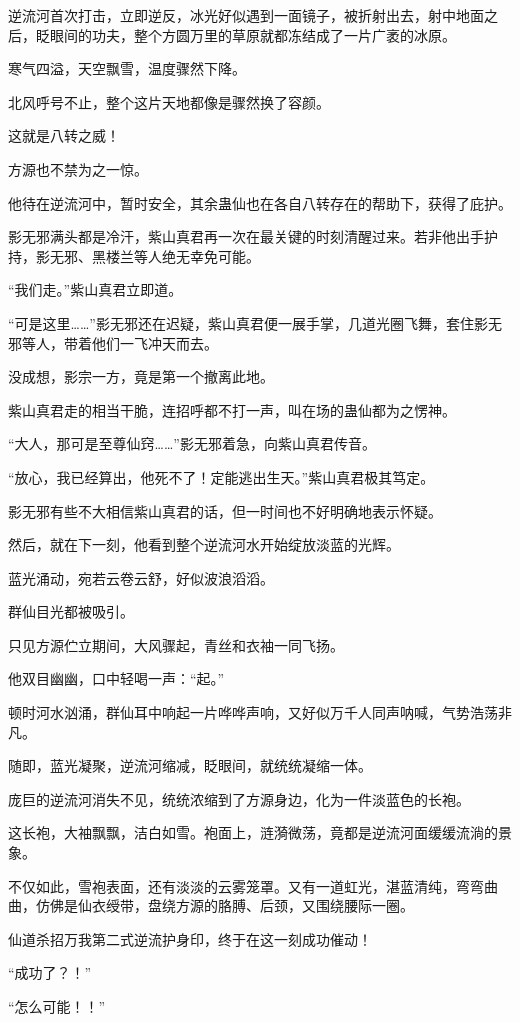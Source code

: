 \begin{this_body}
逆流河首次打击，立即逆反，冰光好似遇到一面镜子，被折射出去，射中地面之后，眨眼间的功夫，整个方圆万里的草原就都冻结成了一片广袤的冰原。

寒气四溢，天空飘雪，温度骤然下降。

北风呼号不止，整个这片天地都像是骤然换了容颜。

这就是八转之威！

方源也不禁为之一惊。

他待在逆流河中，暂时安全，其余蛊仙也在各自八转存在的帮助下，获得了庇护。

影无邪满头都是冷汗，紫山真君再一次在最关键的时刻清醒过来。若非他出手护持，影无邪、黑楼兰等人绝无幸免可能。

“我们走。”紫山真君立即道。

“可是这里……”影无邪还在迟疑，紫山真君便一展手掌，几道光圈飞舞，套住影无邪等人，带着他们一飞冲天而去。

没成想，影宗一方，竟是第一个撤离此地。

紫山真君走的相当干脆，连招呼都不打一声，叫在场的蛊仙都为之愣神。

“大人，那可是至尊仙窍……”影无邪着急，向紫山真君传音。

“放心，我已经算出，他死不了！定能逃出生天。”紫山真君极其笃定。

影无邪有些不大相信紫山真君的话，但一时间也不好明确地表示怀疑。

然后，就在下一刻，他看到整个逆流河水开始绽放淡蓝的光辉。

蓝光涌动，宛若云卷云舒，好似波浪滔滔。

群仙目光都被吸引。

只见方源伫立期间，大风骤起，青丝和衣袖一同飞扬。

他双目幽幽，口中轻喝一声：“起。”

顿时河水汹涌，群仙耳中响起一片哗哗声响，又好似万千人同声呐喊，气势浩荡非凡。

随即，蓝光凝聚，逆流河缩减，眨眼间，就统统凝缩一体。

庞巨的逆流河消失不见，统统浓缩到了方源身边，化为一件淡蓝色的长袍。

这长袍，大袖飘飘，洁白如雪。袍面上，涟漪微荡，竟都是逆流河面缓缓流淌的景象。

不仅如此，雪袍表面，还有淡淡的云雾笼罩。又有一道虹光，湛蓝清纯，弯弯曲曲，仿佛是仙衣绶带，盘绕方源的胳膊、后颈，又围绕腰际一圈。

仙道杀招万我第二式逆流护身印，终于在这一刻成功催动！

“成功了？！”

“怎么可能！！”


\end{this_body}

